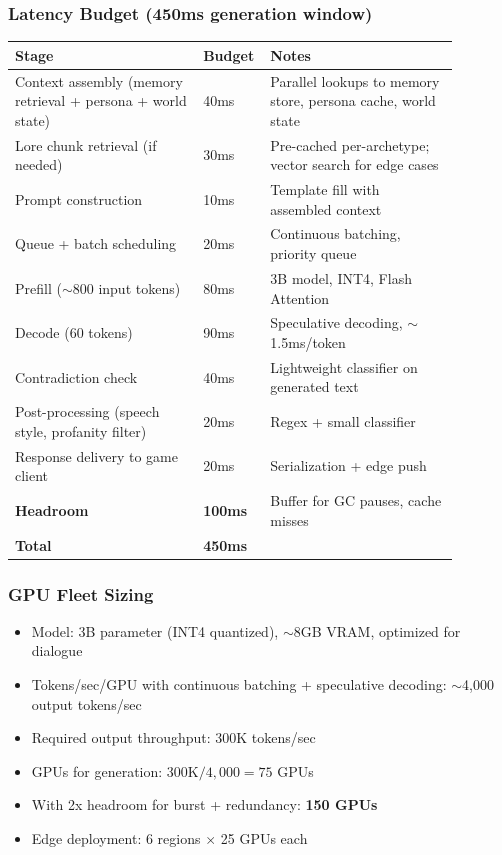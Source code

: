 \subsubsection*{Latency Budget (450ms generation window)}

\begin{tabular}{|p{0.4\linewidth}|p{0.08\linewidth}|p{0.4\linewidth}|}
\hline
\textbf{Stage} & \textbf{Budget} & \textbf{Notes} \\
\hline
Context assembly (memory retrieval + persona + world state) & 40ms & Parallel lookups to memory store, persona cache, world state \\
\hline
Lore chunk retrieval (if needed) & 30ms & Pre-cached per-archetype; vector search for edge cases \\
\hline
Prompt construction & 10ms & Template fill with assembled context \\
\hline
Queue + batch scheduling & 20ms & Continuous batching, priority queue \\
\hline
Prefill ($\sim$800 input tokens) & 80ms & 3B model, INT4, Flash Attention \\
\hline
Decode (60 tokens) & 90ms & Speculative decoding, $\sim$1.5ms/token \\
\hline
Contradiction check & 40ms & Lightweight classifier on generated text \\
\hline
Post-processing (speech style, profanity filter) & 20ms & Regex + small classifier \\
\hline
Response delivery to game client & 20ms & Serialization + edge push \\
\hline
\textbf{Headroom} & \textbf{100ms} & Buffer for GC pauses, cache misses \\
\hline
\textbf{Total} & \textbf{450ms} & \\
\hline
\end{tabular}

\subsubsection*{GPU Fleet Sizing}
\begin{itemize}
  \item Model: 3B parameter (INT4 quantized), $\sim$8GB VRAM, optimized for dialogue
  \item Tokens/sec/GPU with continuous batching + speculative decoding: $\sim$4,000 output tokens/sec
  \item Required output throughput: 300K tokens/sec
  \item GPUs for generation: $300\text{K} / 4{,}000 = 75$ GPUs
  \item With 2x headroom for burst + redundancy: \textbf{150 GPUs}
  \item Edge deployment: 6 regions $\times$ 25 GPUs each
\end{itemize}


